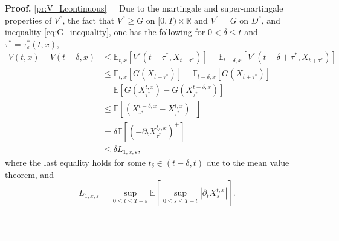 \documentclass{tufte-handout}
\newcommand{\E}{\mathbb{E}} %
\newcommand{\R}{\mathbb{R}} %
\newenvironment{pf}[1][Proof]{\textbf{#1.} }{\ \rule{0.5em}{0.5em}}
\begin{document}
	\begin{pf}
		\ref{pr:V_Lcontinuous}\ \ \ Due to the martingale and super-martingale properties of $V^\varepsilon$, the fact that $V^\varepsilon \geq G$ on $[0, T)\times\R$ and $V^\varepsilon = G$ on $D^\varepsilon$, and inequality \eqref{eq:G_inequality}, one has the following for $0 < \delta \leq t$ and $\tau^* = \tau_\varepsilon^*(t, x)$, 
		\begin{align}
		V(t, x) - V(t - \delta, x) &\leq \E_{t, x}\left[V^\varepsilon(t + \tau^*, X_{t + \tau^*})\right] - \E_{t - \delta, x}\left[V^\varepsilon(t - \delta + \tau^*, X_{t + \tau^*})\right] \nonumber \\
		&\leq \E_{t, x}\left[G(X_{t + \tau^*})\right] - \E_{t - \delta, x}\left[G(X_{t + \tau^*})\right] \nonumber \\
		&= \E\left[G\left(X_{\tau^*}^{t, x}\right) - G\left(X_{\tau^*}^{t - \delta, x}\right)\right] \nonumber \\
		&\leq \E\left[\left(X_{\tau^*}^{t - \delta, x} - X_{\tau^*}^{t, x}\right)^+\right] \nonumber \\
		&= \delta\E\left[\left(-\partial_tX_{\tau^*}^{t_\delta, x}\right)^+\right] \label{eq:V^epst-V^epst-delta<} \\
		&\leq \delta L_{1, x, \varepsilon}, \nonumber
		\end{align}
		where the last equality holds for some $t_\delta\in(t - \delta, t)$ due to the mean value theorem, and
		$$
		L_{1, x, \varepsilon} = \sup_{0\leq t \leq T - \varepsilon}\E\left[\sup_{0\leq s \leq T - t}|\partial_tX_s^{t, x}|\right].
		$$
		

\end{pf}
\end{document}
